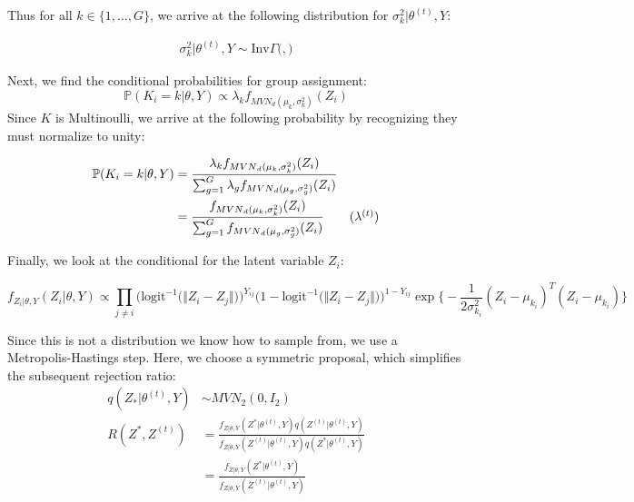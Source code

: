 \documentclass{article}
\begin{document}
Thus for all $k \in \{1, \ldots, G\}$, we arrive at the following distribution for $\sigma_k^2 | \theta^{(t)}, Y$:

\begin{align*}
\sigma_k^2 | \theta^{(t)}, Y \sim \text{Inv}\Gamma\Big( , \Big)
\end{align*}

Next, we find the conditional probabilities for group assignment:
\[\mathbb{P}(K_i = k | \theta, Y) \propto \lambda_k f_{{MVN}_d(\mu_k, \sigma_k^2)}(Z_i)\]
Since $K$ is Multinoulli, we arrive at the following probability by recognizing they must normalize to unity:

\begin{align*}
\mathbb{P}(K_i = k | \theta, Y) &= \frac{\lambda_k f_{{MVN}_d(\mu_k, \sigma_k^2)}(Z_i)}{\sum_{g=1}^G\lambda_g f_{{MVN}_d(\mu_g, \sigma_g^2)}(Z_i)} \\
&= \frac{f_{{MVN}_d(\mu_k, \sigma_k^2)}(Z_i)}{\sum_{g=1}^G f_{{MVN}_d(\mu_g, \sigma_g^2)}(Z_i)} \tag{$\lambda^{(t)}$}
\end{align*}

Finally, we look at the conditional for the latent variable $Z_i$:

\[f_{Z_i | \theta, Y}(Z_i | \theta, Y) \propto \prod_{j \neq i}\Big(\text{logit}^{-1}\big(\Vert Z_i-Z_j\Vert)\Big)^{Y_{ij}}\Big(1 - \text{logit}^{-1}\big(\Vert Z_i-Z_j\Vert)\Big)^{1 - Y_{ij}} \exp\Big\{-\frac{1}{2\sigma_{k_i}^2}(Z_i - \mu_{k_i})^T( Z_i - \mu_{k_i}) \Big\}\]

Since this is not a distribution we know how to sample from, we use a Metropolis-Hastings step. Here, we choose a symmetric proposal, which simplifies the subsequent rejection ratio:
\begin{align*}
q(Z_* | \theta^{(t)}, Y) &\sim MVN_2(0, I_2) \\
R(Z^*, Z^{(t)}) &= \frac{f_{Z | \theta, Y}(Z^* | \theta^{(t)}, Y)q(Z^{(t)} | \theta^{(t)}, Y)}{f_{Z | \theta, Y}(Z^{(t)} | \theta^{(t)}, Y)q(Z^* | \theta^{(t)}, Y)} \\
&= \frac{f_{Z | \theta, Y}(Z^* | \theta^{(t)}, Y)}{f_{Z | \theta, Y}(Z^{(t)} | \theta^{(t)}, Y)} 
\end{align*}
\end{document}
